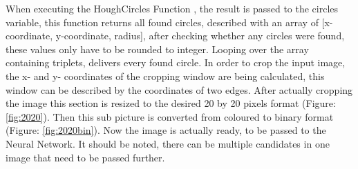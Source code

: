 When executing the HoughCircles Function \cite{houghcircles}, the result is passed to the circles variable, this function returns all found circles, described with an array of [x-coordinate, y-coordinate, radius],  after checking whether any circles were found, these values only have to be rounded to integer. Looping  over the array containing triplets, delivers every found circle. \newline
In order to crop the input image, the x- and y- coordinates of the cropping window are being calculated, this window can be described by the coordinates of two edges. After actually cropping the image this section is resized to the desired 20 by 20 pixels format (Figure: \ref{fig:2020}). Then this sub picture is converted from coloured to binary format (Figure: \ref{fig:2020bin}). Now the image is actually ready, to be passed to the Neural Network. It should be noted, there can be multiple candidates in one image that need to be passed further.   

